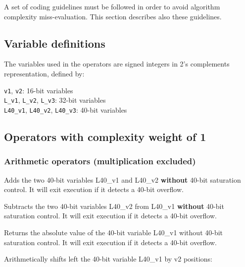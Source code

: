 A set of coding guidelines must be followed in order to avoid
algorithm complexity miss-evaluation. This section describes also
these guidelines.

\subsection{Variable definitions}

The variables used in the operators are signed integers in 2's
complements representation, defined by:

{\tt v1}, {\tt v2}: 16-bit variables\\
{\tt L\_v1}, {\tt L\_v2}, {\tt L\_v3}: 32-bit variables\\
{\tt L40\_v1}, {\tt L40\_v2}, {\tt L40\_v3}: 40-bit variables\\

\subsection{Operators with complexity weight of 1}
\subsubsection{Arithmetic operators (multiplication excluded)}


Adds the two 40-bit variables L40\_v1 and L40\_v2 \textbf{without}
40-bit saturation control. It will exit execution if it detects a 40-bit overflow.



Subtracts the two 40-bit variables L40\_v2 from L40\_v1
\textbf{without} 40-bit saturation control. 
It will exit execution if it detects a 40-bit overflow.


Returns the absolute value of the 40-bit variable L40\_v1 without
40-bit saturation control. 
It will exit execution if it detects a 40-bit overflow.


Arithmetically shifts left the 40-bit variable L40\_v1 by v2
positions:

